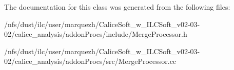 The documentation for this class was generated from the following files\-:\begin{DoxyCompactItemize}
\item 
/nfs/dust/ilc/user/marquezh/\-Calice\-Soft\-\_\-w\-\_\-\-I\-L\-C\-Soft\-\_\-v02-\/03-\/02/calice\-\_\-analysis/addon\-Procs/include/Merge\-Processor.\-h\item 
/nfs/dust/ilc/user/marquezh/\-Calice\-Soft\-\_\-w\-\_\-\-I\-L\-C\-Soft\-\_\-v02-\/03-\/02/calice\-\_\-analysis/addon\-Procs/src/Merge\-Processor.\-cc\end{DoxyCompactItemize}
